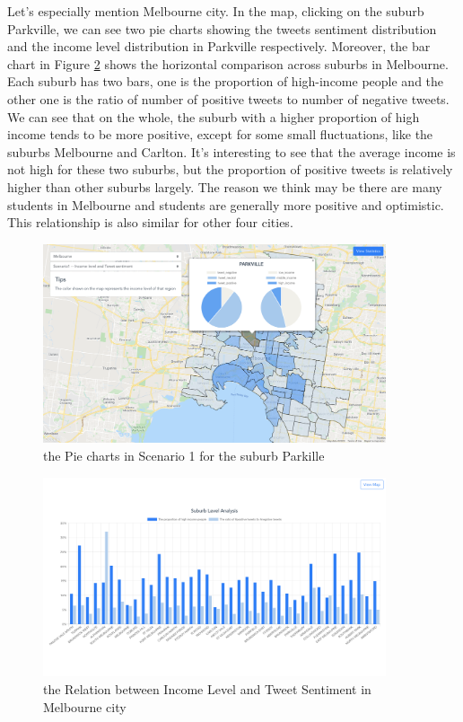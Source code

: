 \documentclass{article}
\begin{document}
Let’s especially mention Melbourne city. In the map, clicking on the suburb Parkville, we can see two pie charts showing the tweets sentiment distribution and the income level  distribution in Parkville respectively. Moreover, the bar chart in Figure 
\ref{fig:Melbourne_histogram} shows the horizontal comparison across suburbs in Melbourne. Each suburb has two bars, one is the proportion of high-income people and the other one is the ratio of number of positive tweets to number of negative tweets. We can see that on the whole, the suburb with a higher proportion of high income tends to be more positive, except for some small fluctuations, like the suburbs Melbourne and Carlton. It's interesting to see that the average income is not high for these two suburbs, but the proportion of positive tweets is relatively higher than other suburbs largely. The reason we think may be there are many students in Melbourne and students are generally more positive and optimistic. This relationship is also similar for other four cities.

\begin{figure}[htp]
\centering
\includegraphics[width=0.9\textwidth]{img/Melbourne_pie_chart.png}
\caption{the Pie charts in Scenario 1 for the suburb Parkille}
\label{fig:Melbourne_pie_chart}
\end{figure}

\begin{figure}[htp]
\centering
\includegraphics[width=0.9\textwidth]{img/Melbourne_histogram.png}
\caption{the Relation between Income Level and Tweet Sentiment in Melbourne city}
\label{fig:Melbourne_histogram}
\end{figure}
\end{document}
